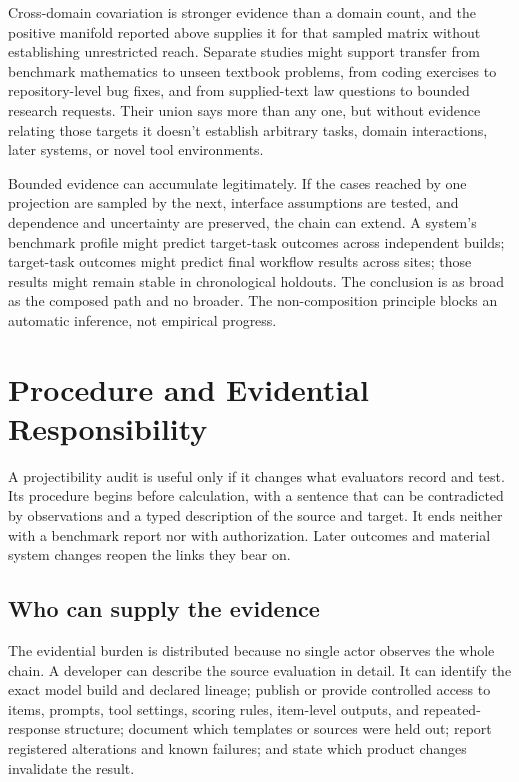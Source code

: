 \documentclass[12pt]{article}
\begin{document}
Cross-domain covariation is stronger evidence than a domain count, and the positive manifold reported above supplies it for that sampled matrix without establishing unrestricted reach. Separate studies might support transfer from benchmark mathematics to unseen textbook problems, from coding exercises to repository-level bug fixes, and from supplied-text law questions to bounded research requests. Their union says more than any one, but without evidence relating those targets it doesn't establish arbitrary tasks, domain interactions, later systems, or novel tool environments.

Bounded evidence can accumulate legitimately. If the cases reached by one projection are sampled by the next, interface assumptions are tested, and dependence and uncertainty are preserved, the chain can extend. A system's benchmark profile might predict target-task outcomes across independent builds; target-task outcomes might predict final workflow results across sites; those results might remain stable in chronological holdouts. The conclusion is as broad as the composed path and no broader. The non-composition principle blocks an automatic inference, not empirical progress.

\section{Procedure and Evidential Responsibility}\label{sec:procedure}

A projectibility audit is useful only if it changes what evaluators record and test. Its procedure begins before calculation, with a sentence that can be contradicted by observations and a typed description of the source and target. It ends neither with a benchmark report nor with authorization. Later outcomes and material system changes reopen the links they bear on.

\subsection{Who can supply the evidence}\label{ssec:responsibility}

The evidential burden is distributed because no single actor observes the whole chain. A developer can describe the source evaluation in detail. It can identify the exact model build and declared lineage; publish or provide controlled access to items, prompts, tool settings, scoring rules, item-level outputs, and repeated-response structure; document which templates or sources were held out; report registered alterations and known failures; and state which product changes invalidate the result.
\end{document}
